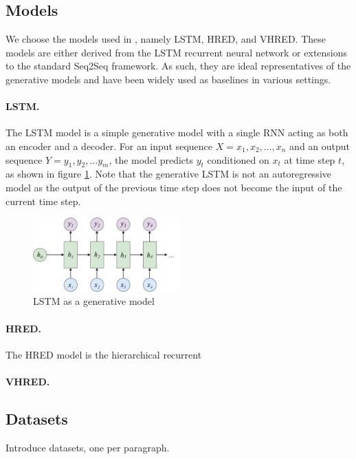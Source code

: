 \documentclass[runningheads]{llncs}
\begin{document}
    \subsection{Models}
    We choose the models used in \cite{VHRED}, namely LSTM, HRED, and VHRED. These models are either derived from the LSTM recurrent neural network \cite{LSTM} or extensions to the standard Seq2Seq framework. As such, they are ideal representatives of the generative models and have been widely used as baselines in various settings.

    \paragraph{LSTM.}
    The LSTM model is a simple generative model with a single RNN acting as both an encoder and a decoder. For an input sequence $X = x_1, x_2, \dots, x_n$ and an output sequence $Y = y_1, y_2, \dots y_m$, the model predicts $y_t$ conditioned on $x_t$ at time step $t$, as shown in figure \ref{fig:LSTM_as_generative}. Note that the generative LSTM is not an autoregressive model as the output of the previous time step does not become the input of the current time step.
    \begin{figure}
        \centering
        \includegraphics[width=0.5\textwidth]{figure/LSTM/generative.pdf}
        \caption{LSTM as a generative model}
        \label{fig:LSTM_as_generative}
    \end{figure}

    \paragraph{HRED.}
    The HRED model is the hierarchical recurrent

    \paragraph{VHRED.}

    \subsection{Datasets}
    Introduce datasets, one per paragraph.
\end{document}
